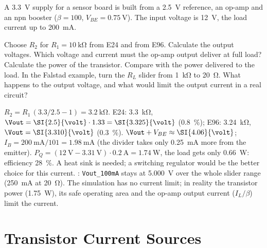 A \SI{3.3}{\volt} supply for a sensor board is built from a \SI{2.5}{\volt} reference, an op-amp
and an npn booster ($\beta = 100$, $V_{BE} = \SI{0.75}{\volt}$). The input voltage is \SI{12}{\volt},
the load current up to \SI{200}{\milli\ampere}.
\begin{talist}
\ta Choose $R_2$ for $R_1 = \SI{10}{\kilo\ohm}$ from E24 and from E96. Calculate the output voltages.
\ta Which voltage and current must the op-amp output deliver at full load?
\ta Calculate the power of the transistor. Compare with the power delivered to the load.
\ta In the Falstad example, turn the $R_L$ slider from \SI{1}{\kilo\ohm} to \SI{20}{\ohm}. What happens to the output voltage,
    and what would limit the output current in a real circuit?
\end{talist}

\begin{solution}
\begin{talist}
\ta $R_2 = R_1\,(3.3/2.5-1) = \SI{3.2}{\kilo\ohm}$. E24: \SI{3.3}{\kilo\ohm}, $\Vout = \SI{2.5}{\volt}\cdot 1.33 = \SI{3.325}{\volt}$ (\SI{+0.8}{\percent});
    E96: \SI{3.24}{\kilo\ohm}, $\Vout = \SI{3.310}{\volt}$ (\SI{+0.3}{\percent}).
\ta $\Vout + V_{BE} \approx \SI{4.06}{\volt}$; $I_B = \SI{200}{\milli\ampere}/101 = \SI{1.98}{\milli\ampere}$ (the divider takes only \SI{0.25}{\milli\ampere} more from the emitter).
\ta $P_Q = (\SI{12}{\volt}-\SI{3.31}{\volt})\cdot\SI{0.2}{\ampere} = \SI{1.74}{\watt}$, the load gets only \SI{0.66}{\watt}:
    efficiency \SI{28}{\percent}. A heat sink is needed; a switching regulator would be the better choice for this current.
\ta {}: \texttt{Vout\_100mA} stays at \SI{5.000}{\volt} over the whole slider range
    (\SI{250}{\milli\ampere} at \SI{20}{\ohm}). The simulation has no current limit; in reality the transistor power
    (\SI{1.75}{\watt}), its safe operating area and the op-amp output current ($I_L/\beta$) limit the current.
\end{talist}
\end{solution}

\section{Transistor Current Sources}

